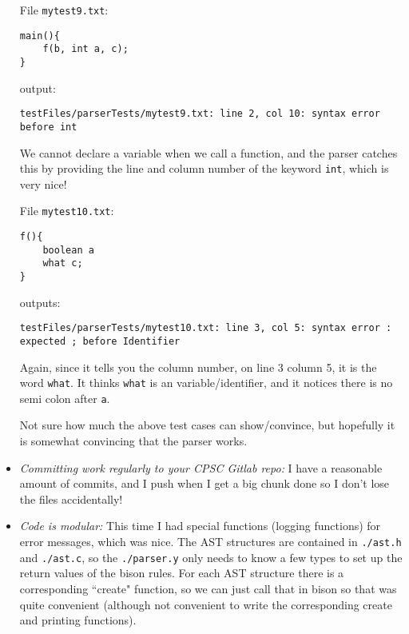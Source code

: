 \documentclass{article}
\begin{document}
\begin{itemize}
        File \verb|mytest9.txt|:
        \begin{verbatim}
main(){
    f(b, int a, c);
}
        \end{verbatim}
        output:
        \begin{verbatim}
testFiles/parserTests/mytest9.txt: line 2, col 10: syntax error  before int
        \end{verbatim}
        We cannot declare a variable when we call a function, and the parser catches this by providing the line and column number of the keyword \verb|int|, which is very nice!
        
        File \verb|mytest10.txt|:
        \begin{verbatim}
f(){
    boolean a
    what c;
}
        \end{verbatim}
        outputs:
        \begin{verbatim}
testFiles/parserTests/mytest10.txt: line 3, col 5: syntax error : expected ; before Identifier
        \end{verbatim}
        Again, since it tells you the column number, on line 3 column 5, it is the word \verb|what|. It thinks \verb|what| is an variable/identifier, and it notices there is no semi colon after \verb|a|.

        Not sure how much the above test cases can show/convince, but hopefully it is somewhat convincing that the parser works.

    \item \emph{Committing work regularly to your CPSC Gitlab repo:} I have a reasonable amount of commits, and I push when I get a big chunk done so I don't lose the files accidentally!
    \item \emph{Code is modular:} This time I had special functions (logging functions) for error messages, which was nice. The AST structures are contained in \verb|./ast.h| and \verb|./ast.c|, so the \verb|./parser.y| only needs to know a few types to set up the return values of the bison rules. For each AST structure there is a corresponding ``create" function, so we can just call that in bison so that was quite convenient (although not convenient to write the corresponding create and printing functions).


\end{itemize}
\end{document}

